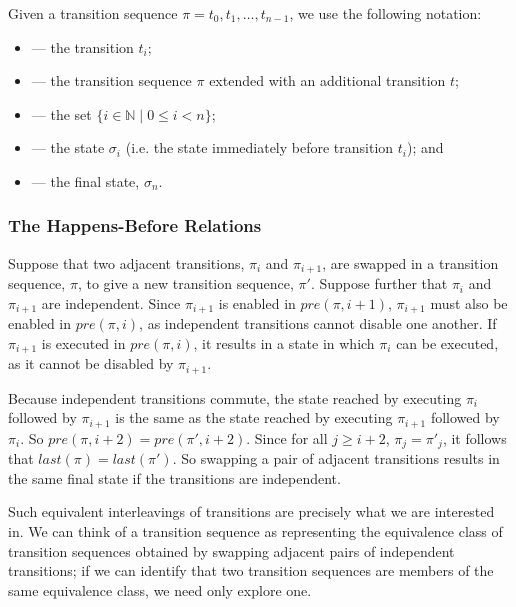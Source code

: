 \documentclass[12pt,a4paper,twoside,openright]{report}
\begin{document}
Given a transition sequence $\pi = t_0, t_1, \ldots, t_{n-1}$,
we use the following notation:
\begin{itemize}[label={}]
	\newcommand{\defsindent}{3.5em}
	\item{\makebox[\defsindent]{\hfill$\pi_i$}
		--- the transition $t_i$;}
	\item{\makebox[\defsindent]{\hfill$\pi.t$}
		--- the transition sequence $\pi$ extended with
		an additional transition $t$;}
	\item{\makebox[\defsindent]{\hfill$\textit{dom}(\pi)$}
		--- the set $\{i \in \mathbb{N} \mid 0 \leq i < n \}$;}
	\item{\makebox[\defsindent]{\hfill$\textit{pre}(\pi, i)$}
		--- the state $\sigma_i$ (i.e. the
		state immediately before transition $t_i$); and}
	\item{\makebox[\defsindent]{\hfill$\textit{last}(\pi)$}
		--- the final state, $\sigma_n$.}
\end{itemize}

\subsubsection{The Happens-Before Relations}\label{sec:happens-before}

Suppose that two adjacent transitions, $\pi_i$ and $\pi_{i+1}$,
are swapped in a
transition sequence, $\pi$, to give a new
transition sequence, $\pi'$. Suppose further
that $\pi_i$ and $\pi_{i+1}$ are independent.
Since $\pi_{i+1}$ is enabled in $\textit{pre}(\pi, i+1)$,
$\pi_{i+1}$ must also be enabled in $\textit{pre}(\pi, i)$,
as independent transitions cannot disable one another.
If $\pi_{i+1}$
is executed in $\textit{pre}(\pi, i)$,
it results in a state in which $\pi_i$
can be executed, as it cannot be disabled by $\pi_{i+1}$.

Because independent transitions commute, the state reached by
executing $\pi_i$ followed by $\pi_{i+1}$ is the same
as the state reached by executing $\pi_{i+1}$ followed
by $\pi_i$.
So $\textit{pre}(\pi, i+2) = \textit{pre}(\pi', i+2)$. Since 
for all $j \geq i + 2$, $\pi_j = \pi'_j$, it follows that
$\textit{last}(\pi) = \textit{last}(\pi')$. So swapping
a pair of adjacent transitions results in the same
final state if the transitions are independent.

Such equivalent interleavings
of transitions are precisely what we are interested in.
We can think of a transition sequence as representing
the equivalence class of transition sequences obtained
by swapping adjacent pairs of independent transitions;
if we can identify that two transition sequences are
members of the same equivalence class, we need only
explore one.
\end{document}
